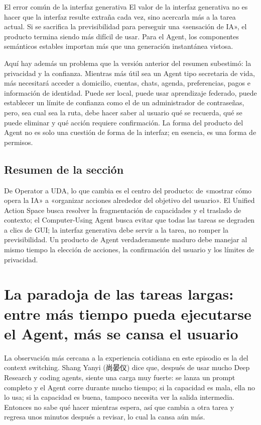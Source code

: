 \documentclass[a4paper]{article}
\begin{document}
\begin{warningbox}{El error común de la interfaz generativa}
El valor de la interfaz generativa no es hacer que la interfaz resulte extraña cada vez, sino acercarla más a la tarea actual. Si se sacrifica la previsibilidad para perseguir una «sensación de IA», el producto termina siendo más difícil de usar. Para el Agent, los componentes semánticos estables importan más que una generación instantánea vistosa.
\end{warningbox}

Aquí hay además un problema que la versión anterior del resumen subestimó: la privacidad y la confianza. Mientras más útil sea un Agent tipo secretaria de vida, más necesitará acceder a domicilio, cuentas, chats, agenda, preferencias, pagos e información de identidad. Puede ser local, puede usar aprendizaje federado, puede establecer un límite de confianza como el de un administrador de contraseñas, pero, sea cual sea la ruta, debe hacer saber al usuario qué se recuerda, qué se puede eliminar y qué acción requiere confirmación. La forma del producto del Agent no es solo una cuestión de forma de la interfaz; en esencia, es una forma de permisos.

\subsection{Resumen de la sección}

De Operator a UDA, lo que cambia es el centro del producto: de «mostrar cómo opera la IA» a «organizar acciones alrededor del objetivo del usuario». El Unified Action Space busca resolver la fragmentación de capacidades y el traslado de contexto; el Computer-Using Agent busca evitar que todas las tareas se degraden a clics de GUI; la interfaz generativa debe servir a la tarea, no romper la previsibilidad. Un producto de Agent verdaderamente maduro debe manejar al mismo tiempo la elección de acciones, la confirmación del usuario y los límites de privacidad.
\section{La paradoja de las tareas largas: entre más tiempo pueda ejecutarse el Agent, más se cansa el usuario}

La observación más cercana a la experiencia cotidiana en este episodio es la del context switching. Shang Yanyi (尚晏仪) dice que, después de usar mucho Deep Research y coding agents, siente una carga muy fuerte: se lanza un prompt completo y el Agent corre durante mucho tiempo; si la capacidad es mala, ella no lo usa; si la capacidad es buena, tampoco necesita ver la salida intermedia. Entonces no sabe qué hacer mientras espera, así que cambia a otra tarea y regresa unos minutos después a revisar, lo cual la cansa aún más.
\end{document}
